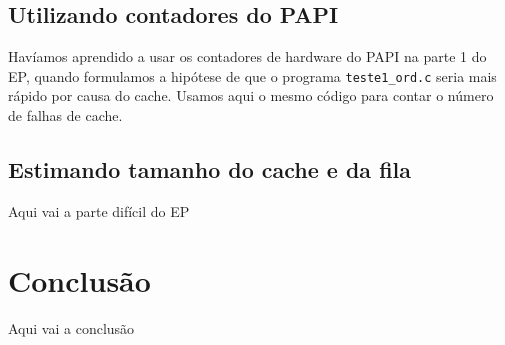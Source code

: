 \documentclass[a4paper,oneside,12pt]{article}
\begin{document}
\subsection{Utilizando contadores do PAPI}

Havíamos aprendido a usar os contadores de hardware do PAPI na parte 1 do EP, quando formulamos a hipótese de que o programa {\tt teste1\_ord.c} seria mais rápido por causa do cache. Usamos aqui o mesmo código para contar o número de falhas de cache.

\subsection{Estimando tamanho do cache e da fila}

Aqui vai a parte difícil do EP %

\section{Conclusão}

Aqui vai a conclusão %
\end{document}
